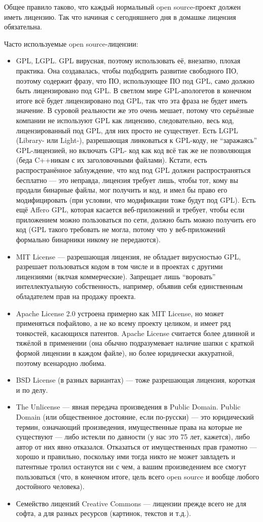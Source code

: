 \documentclass[a5paper]{article}
\begin{document}
Общее правило таково, что каждый нормальный open source-проект должен иметь лицензию. Так что начиная с сегодняшнего дня в домашке лицензия обязательна.

Часто используемые open source-лицензии:

\begin{itemize}
	\item GPL, LGPL. GPL вирусная, поэтому использовать её, внезапно, плохая практика. Она создавалась, чтобы подбодрить развитие свободного ПО, поэтому содержит фразу, что ПО, использующее ПО под GPL, само должно быть лицензировано под GPL. В светлом мире GPL-апологетов в конечном итоге всё будет лицензировано под GPL, так что эта фраза не будет иметь значение. В суровой реальности же это очень мешает, потому что серьёзные компании не используют GPL как лицензию, следовательно, весь код, лицензированный под GPL, для них просто не существует. Есть LGPL (Library- или Light-), разрешающая линковаться к GPL-коду, не ``заражаясь'' GPL-лицензией, но включать GPL- код как код всё так же не позволяющая (беда C++никам с их заголовочными файлами). Кстати, есть распространённое заблуждение, что код под GPL должен распространяться бесплатно --- это неправда, лицензия требует лишь, чтобы тот, кому вы продали бинарные файлы, мог получить и код, и имел бы право его модифицировать (при условии, что модификации тоже будут под GPL). Есть ещё Affero GPL, которая касается веб-приложений и требует, чтобы если приложением можно пользоваться по сети, должно быть можно получить его код (GPL такого требовать не могла, потому что у веб-приложений формально бинарники никому не передаются).
	\item MIT License --- разрешающая лицензия, не обладает вирусностью GPL, разрешает пользоваться кодом в том числе и в проектах с другими лицензиями (вклчая коммерческие). Запрещает лишь ``воровать'' интеллектуальную собственность, например, объявив себя единственным обладателем прав на продажу проекта.
	\item Apache License 2.0 устроена примерно как MIT License, но может применяться пофайлово, а не ко всему проекту целиком, и имеет ряд тонкостей, касающихся патентов. Apache License считается более длинной и тяжёлой в применении (она обычно подразумевает наличие шапки с краткой формой лицензии в каждом файле), но более юридически аккуратной, поэтому всенародно любима.
	\item BSD License (в разных вариантах) --- тоже разрешающая лицензия, короткая и по делу.
	\item The Unlicense --- явная передача произведения в Public Domain. Public Domain (или общественное достояние, если по-русски) --- это юридический термин, означающий произведения, имущественные права на которые не существуют --- либо истекли по давности (у нас это 75 лет, кажется), либо автор от них явно отказался. Отказаться от имущественных прав грамотно --- хорошо и правильно, поскольку ими тогда никто не может завладеть и патентные тролил останутся ни с чем, а вашим произведением все смогут пользоваться (что, в конечном итоге, цель всего open source и вообще любого достойного человека).
	\item Семейство лицензий Creative Commons --- лицензии прежде всего не для софта, а для разных ресурсов (картинок, текстов и т.д.).
\end{itemize}
\end{document}
